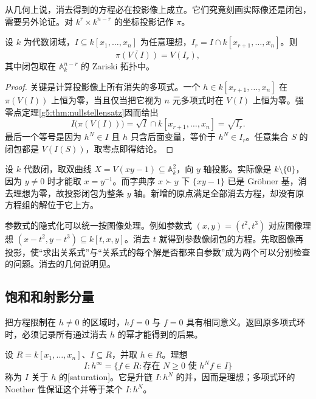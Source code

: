 从几何上说，消去得到的方程必在投影像上成立。它们究竟刻画实际像还是闭包，需要另外论证。对 \(k^{r}\times k^{n-r}\) 的坐标投影记作 \(\pi\)。

\begin{theorem}\label{g5:thm:projection-closure}
	设 \(k\) 为代数闭域，\(I\subseteq k[x_1,\ldots,x_n]\) 为任意理想，\(I_r=I\cap k[x_{r+1},\ldots,x_n]\)。则
	\[
		\overline{\pi(V(I))}=V(I_r),
	\]
	其中闭包取在 \(\mathbb A_k^{n-r}\) 的 Zariski 拓扑中。
\end{theorem}
\begin{proof}
	关键是计算投影像上所有消失的多项式。一个 \(h\in k[x_{r+1},\ldots,x_n]\) 在 \(\pi(V(I))\) 上恒为零，当且仅当把它视为 \(n\) 元多项式时在 \(V(I)\) 上恒为零。强零点定理\cref{g5:thm:nullstellensatz}因而给出
	\[
		I\bigl(\pi(V(I))\bigr)
		=\sqrt I\cap k[x_{r+1},\ldots,x_n]
		=\sqrt{I_r}.
	\]
	最后一个等号是因为 \(h^N\in I\) 且 \(h\) 只含后面变量，等价于 \(h^N\in I_r\)。任意集合 \(S\) 的闭包都是 \(V(I(S))\)，取零点即得结论。
\end{proof}

\begin{example}\label{g5:exm:projection-not-closed}
	设 \(k\) 代数闭，取双曲线 \(X=V(xy-1)\subseteq\mathbb A_k^2\)，向 \(y\) 轴投影。实际像是 \(k\setminus\{0\}\)，因为 \(y\ne0\) 时才能取 \(x=y^{-1}\)。而字典序 \(x\succ y\) 下 \(\{xy-1\}\) 已是 Gröbner 基，消去理想为零，故投影闭包为整条 \(y\) 轴。新增的原点满足全部消去方程，却没有原方程组的解位于它上方。
\end{example}

参数式的隐式化可以统一按图像处理。例如参数式 \((x,y)=(t^2,t^3)\) 对应图像理想 \((x-t^2,y-t^3)\subseteq k[t,x,y]\)。消去 \(t\) 就得到参数像闭包的方程。先取图像再投影，使“求出关系式”与“关系式的每个解是否都来自参数”成为两个可以分别检查的问题。消去的几何说明见\cite[第3章第1--2节]{CoxLittleOShea2015}。

\subsection{饱和和射影分量}
\label{g5:subsec:0104:04}
把方程限制在 \(h\ne0\) 的区域时，\(hf=0\) 与 \(f=0\) 具有相同意义。返回原多项式环时，必须记录所有通过消去 \(h\) 的幂才能得到的后果。

\begin{definition}\label{g5:def:saturation}
	设 \(R=k[x_1,\ldots,x_n]\)、\(I\subseteq R\)，并取 \(h\in R\)。理想
	\[
		I:h^\infty=\{f\in R:\text{存在 }N\ge0\text{ 使 }h^Nf\in I\}
	\]
	称为 \(I\) 关于 \(h\) 的[saturation]。它是升链 \(I:h^N\) 的并，因而是理想；多项式环的 Noether 性保证这个并等于某个 \(I:h^N\)。
\end{definition}

